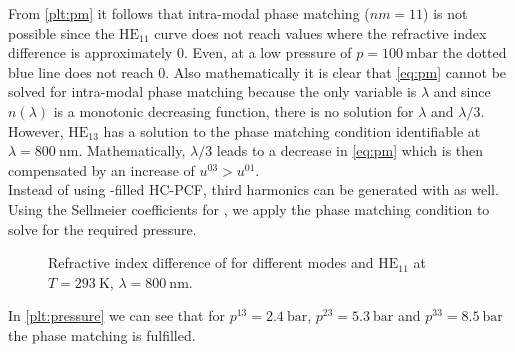 \documentclass[fleqn, 10pt, twocolumn]{SelfArx}
\begin{document}
    From \autoref{plt:pm} it follows that intra-modal phase matching ($nm = 11$) is not possible since the $\text{HE}_{11}$ curve does not reach values where the refractive index difference is approximately 0.
    Even, at a low pressure of $p=\SI{100}{\milli\bar}$ the dotted blue line does not reach 0. 
    Also mathematically it is clear that \eqref{eq:pm} cannot be solved for intra-modal phase matching because the only variable is $\lambda$ and since $n(\lambda)$ is a monotonic decreasing function, there is no solution for $\lambda$ and $\lambda/3$. 
    However, $\text{HE}_{13}$ has a solution to the phase matching condition identifiable at $\lambda=\SI{800}{\nano\meter}$.
    Mathematically, $\lambda/3$ leads to a decrease in \eqref{eq:pm} which is then compensated by an increase of $u^{03}>u^{01}$.\\
    Instead of using -filled HC-PCF, third harmonics can be generated with  as well. 
    Using the Sellmeier coefficients for , we apply the phase matching condition to 
    solve for the required pressure.
    \begin{figure}[h]
        \centering
        \caption{Refractive index difference of  for different  modes and $\text{HE}_{11}$ at $T=\SI{293}{\kelvin}$,  $\lambda=\SI{800}{\nano\meter}$.}
        \label{plt:pressure}
    \end{figure}
    In \autoref{plt:pressure} we can see that for $p^{13}=\SI{2.4}{\bar}$, $p^{23}=\SI{5.3}{\bar}$ and $p^{33}=\SI{8.5}{\bar}$ the phase matching is fulfilled. 
\end{document}

